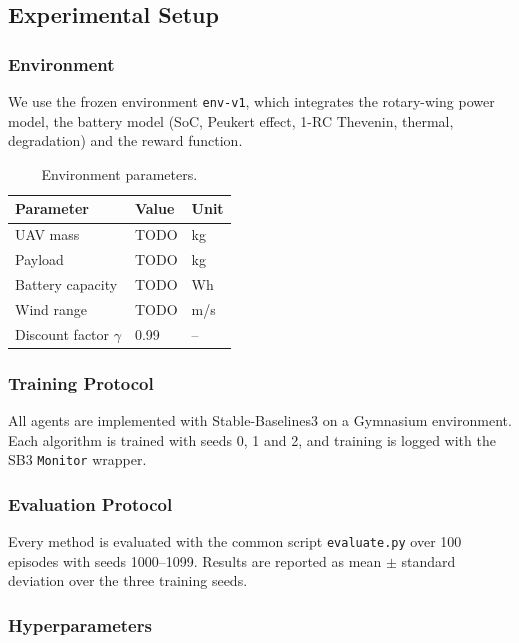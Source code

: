 \subsection{Experimental Setup}
\label{sec:setup}

\subsubsection{Environment}
We use the frozen environment \texttt{env-v1}, which integrates the rotary-wing power model, the battery model (SoC, Peukert effect, 1-RC Thevenin, thermal, degradation) and the reward function.

\begin{table}[t]
\centering
\small
\caption{Environment parameters.}
\label{tab:env_params}
\begin{tabular}{lll}
\hline
Parameter & Value & Unit \\
\hline
UAV mass & TODO & kg \\
Payload & TODO & kg \\
Battery capacity & TODO & Wh \\
Wind range & TODO & m/s \\
Discount factor $\gamma$ & 0.99 & -- \\
\hline
\end{tabular}
\end{table}

\subsubsection{Training Protocol}
All agents are implemented with Stable-Baselines3 \cite{raffin2021sb3} on a Gymnasium \cite{towers2024gymnasium} environment. Each algorithm is trained with seeds 0, 1 and 2, and training is logged with the SB3 \texttt{Monitor} wrapper.

\subsubsection{Evaluation Protocol}
Every method is evaluated with the common script \texttt{evaluate.py} over 100 episodes with seeds 1000--1099. Results are reported as mean $\pm$ standard deviation over the three training seeds.

\subsubsection{Hyperparameters}
\begin{table}[t]
\centering
\small
\caption{Hyperparameters per algorithm.}
\label{tab:hyperparams}
\end{table}